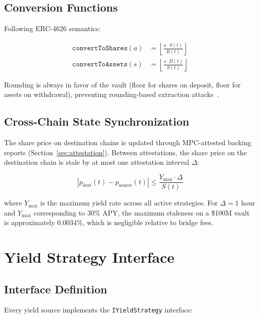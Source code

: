 \documentclass[11pt,twocolumn]{article}
\begin{document}
\subsection{Conversion Functions}

Following ERC-4626 semantics:

\begin{align}
  \texttt{convertToShares}(a) &= \left\lfloor \frac{a \cdot S(t)}{B(t)} \right\rfloor \label{eq:toShares}\\[4pt]
  \texttt{convertToAssets}(s) &= \left\lfloor \frac{s \cdot B(t)}{S(t)} \right\rfloor \label{eq:toAssets}
\end{align}

Rounding is always in favor of the vault (floor for shares on deposit, floor for assets on withdrawal), preventing rounding-based extraction attacks~\cite{erc4626}.

\subsection{Cross-Chain State Synchronization}

The share price on destination chains is updated through MPC-attested backing reports (Section~\ref{sec:attestation}). Between attestations, the share price on the destination chain is stale by at most one attestation interval $\Delta$:

\begin{equation}
  |p_{\text{dest}}(t) - p_{\text{source}}(t)| \leq \frac{Y_{\max} \cdot \Delta}{S(t)}
\end{equation}

where $Y_{\max}$ is the maximum yield rate across all active strategies. For $\Delta = 1$ hour and $Y_{\max}$ corresponding to 30\% APY, the maximum staleness on a \$100M vault is approximately 0.0034\%, which is negligible relative to bridge fees.

\section{Yield Strategy Interface}\label{sec:strategies}

\subsection{Interface Definition}

Every yield source implements the \texttt{IYieldStrategy} interface:
\end{document}
